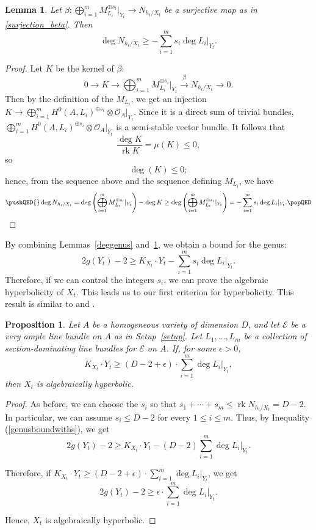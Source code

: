 \documentclass[10pt,a4paper]{article}
\numberwithin{equation}{section}
\newtheorem{lemma}[theorem]{Lemma}
\newtheorem{proposition}[theorem]{Proposition}
\theoremstyle{definition}
\theoremstyle{remark}
\newcommand{\cO}{\mathcal{O}}
\DeclareMathOperator{\rk}{rk}
\begin{document}
\begin{lemma}\label{surjectioninequality}
Let $\beta\colon \bigoplus _{i=1}^{m}M_{L_i}^{\oplus s_i}|_{Y_t}\to N_{h_t/X_t}$ be a surjective map as in \eqref{surjection_beta}. Then
\[ \deg N_{h_t/X_t}\ge -\sum_{i=1}^{m} s_i\deg L_i|_{Y_t}. \]
\end{lemma}
\begin{proof}
Let $K$ be the kernel of $\beta$:
\[ 0\longrightarrow K\longrightarrow \bigoplus _{i=1}^{m}M_{L_i}^{\oplus s_i}|_{Y_t}\overset{\beta}{\longrightarrow} N_{h_t/X_t}\longrightarrow 0. \]
Then by the definition of the $M_{L_i}$, we get an injection $K\to \bigoplus _{i=1}^{m}H^0(A,L_i)^{\oplus s_i}\otimes \cO_A|_{Y_t}$. Since it is a direct sum of trivial bundles, $\bigoplus _{i=1}^{m}H^0(A,L_i)^{\oplus s_i}\otimes \cO_A|_{Y_t}$ is a semi-stable vector bundle. It follows that
\[ \frac{\deg K}{\rk K} = \mu(K)\le 0, \]
so
\[ \deg (K)\le 0; \]
hence, from the sequence above and the sequence defining $M_{L_i}$, we have
\begin{equation*} \pushQED{\qed}
  \deg N_{h_t/X_t} = \deg \left (\bigoplus _{i=1}^{m}M_{L_i}^{\oplus s_i}|_{Y_t}\right ) - \deg K \ge \deg \left (\bigoplus _{i=1}^{m}M_{L_i}^{\oplus s_i}|_{Y_t}\right ) = -\sum_{i=1}^m s_i\deg L_i|_{Y_t}.\qedhere \popQED
  \end{equation*}
\renewcommand{\qed}{}   
\end{proof}

By combining Lemmas~\ref{deggenus} and~\ref{surjectioninequality}, we obtain a bound for the genus:
\begin{equation}\label{genusboundwiths}
     2g(Y_t)-2\ge K_{X_t}\cdot Y_t - \sum_{i=1}^{m} s_i\deg L_i|_{Y_t}.
\end{equation}
Therefore, if we can control the integers $s_i$, we can prove the algebraic hyperbolicity of $X_t$. This leads us to our first criterion for hyperbolicity. This result is similar to \cite[Corollary~2.9]{CR19} and \cite[Theorem~3.6]{HI21}.

\begin{proposition}\label{method_1}
    Let $A$ be a homogeneous variety of dimension $D$, and let $\mathcal{E}$ be a very ample line bundle on $A$ as in Setup~\ref{setup}. Let $L_1, \hdots, L_m$ be a collection of section-dominating line bundles for $\mathcal{E}$ on $A$. If, for some $\epsilon > 0$,
    \[ K_{X_t}\cdot Y_t\ge (D-2+\epsilon)\cdot \sum_{i=1}^m\deg L_i|_{Y_t}, \]
    then $X_t$ is algebraically hyperbolic.
\end{proposition}
\begin{proof}
    As before, we can choose the $s_i$ so that $s_1+\cdots +s_m\le \rk N_{h_t/X_t} = D-2$. In particular, we can assume $s_i\le D-2$ for every $1\le i\le m$. Thus, by Inequality (\ref{genusboundwiths}), we get
    \[ 2g(Y_t)-2\ge K_{X_t}\cdot Y_t - (D-2)\sum_{i=1}^{m} \deg L_i|_{Y_t}.\]
    
    Therefore, if $K_{X_t}\cdot Y_t\ge (D-2+\epsilon)\cdot \sum_{i=1}^m\deg L_i|_{Y_t}$, we get
    \[ 2g(Y_t)-2\ge \epsilon\cdot \sum_{i=1}^m\deg L_i|_{Y_t}. \]
    
    Hence, $X_t$ is algebraically hyperbolic.
\end{proof}
\end{document}
